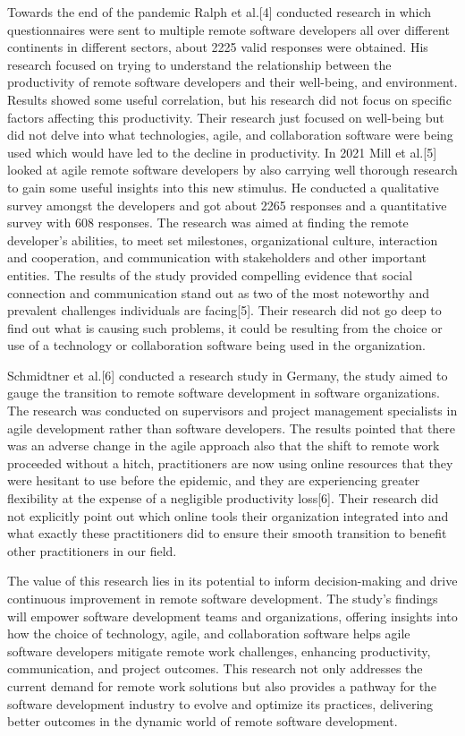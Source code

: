 \documentclass[conference]{IEEEtran}
\begin{document}
Towards the end of the pandemic Ralph et al.[4] conducted research in which questionnaires were sent to multiple remote software developers all over different continents in different sectors, about 2225 valid responses were obtained. His research focused on trying to understand the relationship between the productivity of remote software developers and their well-being, and environment. Results showed some useful correlation, but his research did not focus on specific factors affecting this productivity. Their research just focused on well-being but did not delve into what technologies, agile, and collaboration software were being used which would have led to the decline in productivity. In 2021 Mill et al.[5] looked at agile remote software developers by also carrying well thorough research to gain some useful insights into this new stimulus. He conducted a qualitative survey amongst the developers and got about 2265 responses and a quantitative survey with 608 responses. The research was aimed at finding the remote developer’s abilities, to meet set milestones, organizational culture, interaction and cooperation, and communication with stakeholders and other important entities. The results of the study provided compelling evidence that social connection and communication stand out as two of the most noteworthy and prevalent challenges individuals are facing[5]. Their research did not go deep to find out what is causing such problems, it could be resulting from the choice or use of a technology or collaboration software being used in the organization. 

Schmidtner et al.[6] conducted a research study in Germany, the study aimed to gauge the transition to remote software development in software organizations. The research was conducted on supervisors and project management specialists in agile development rather than software developers. The results pointed that there was an adverse change in the agile approach also that the shift to remote work proceeded without a hitch, practitioners are now using online resources that they were hesitant to use before the epidemic, and they are experiencing greater flexibility at the expense of a negligible productivity loss[6]. Their research did not explicitly point out which online tools their organization integrated into and what exactly these practitioners did to ensure their smooth transition to benefit other practitioners in our field.

The value of this research lies in its potential to inform decision-making and drive continuous improvement in remote software development. The study's findings will empower software development teams and organizations, offering insights into how the choice of technology, agile, and collaboration software helps agile software developers mitigate remote work challenges, enhancing productivity, communication, and project outcomes. This research not only addresses the current demand for remote work solutions but also provides a pathway for the software development industry to evolve and optimize its practices, delivering better outcomes in the dynamic world of remote software development.


\begin{thebibliography}{00}
    \end{thebibliography}
\end{document}
